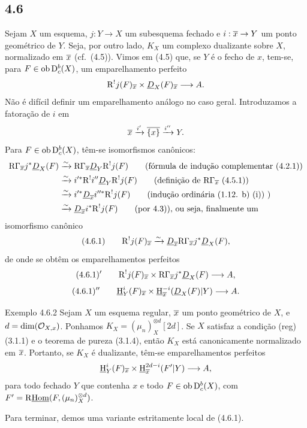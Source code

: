 \subsection*{4.6}
Sejam $X$ um esquema, $j:Y\to X$ um subesquema fechado e $i:\overline{x}\to Y$ um ponto geométrico de $Y$. Seja, por outro lado, $K_X$ um complexo dualizante sobre $X$, normalizado em $\overline{x}$ (cf.~(4.5)). Vimos em (4.5) que, se $Y$ é o fecho de $x$, tem-se, para $F\in\operatorname{ob}\mathrm{D}_c^b(X)$, um emparelhamento perfeito
\[
\mathrm{R}^{!}j(F)_{\overline{x}}\times \underline{D}_X(F)_{\overline{x}}\longrightarrow A.
\]
Não é difícil definir um emparelhamento análogo no caso geral. Introduzamos a fatoração de $i$ em
\[
\overline{x}\xrightarrow{i'}\overline{\{x\}}\xrightarrow{i''}Y.
\]
Para $F\in\operatorname{ob}\mathrm{D}_c^b(X)$, têm-se isomorfismos canônicos:
\[
\begin{aligned}
\mathrm{R}\Gamma_{\overline{x}}j^*\underline{D}_X(F)&\xrightarrow{\sim}\mathrm{R}\Gamma_{\overline{x}}\underline{D}_Y\mathrm{R}^{!}j(F)\qquad\text{(fórmula de indução complementar (4.2.1))}\\
&\xrightarrow{\sim}i'^*\mathrm{R}^{!}i''\underline{D}_Y\mathrm{R}^{!}j(F)\qquad\text{(definição de $\mathrm{R}\Gamma_{\overline{x}}$ (4.5.1))}\\
&\xrightarrow{\sim}i'^*\underline{D}_{\overline{x}}i''^*\mathrm{R}^{!}j(F)\qquad\text{(indução ordinária (1.12. b) (i)) )}\\
&\xrightarrow{\sim}\underline{D}_{\overline{x}}i^*\mathrm{R}^{!}j(F)\qquad\text{(por 4.3)), ou seja, finalmente um}
\end{aligned}
\]
isomorfismo canônico
\[
(4.6.1)\qquad \mathrm{R}^{!}j(F)_{\overline{x}}\xrightarrow{\sim}\underline{D}_{\overline{x}}\mathrm{R}\Gamma_{\overline{x}}j^*\underline{D}_X(F),
\]
de onde se obtêm os emparelhamentos perfeitos
\[
(4.6.1)'\qquad \mathrm{R}^{!}j(F)_{\overline{x}}\times \mathrm{R}\Gamma_{\overline{x}}j^*\underline{D}_X(F)\longrightarrow A,
\]
\[
(4.6.1)''\qquad \underline{\mathrm H}_Y^i(F)_{\overline{x}}\times \underline{\mathrm H}_{\overline{x}}^{-i}(\underline{D}_X(F)|Y)\longrightarrow A.
\]

\begin{statement}{Exemplo 4.6.2}
Sejam $X$ um esquema regular, $\overline{x}$ um ponto geométrico de $X$, e $d=\dim(\mathcal{O}_{X,x})$. Ponhamos $K_X=(\mu_n)_X^{\otimes d}[2d]$. Se $X$ satisfaz a condição (reg) (3.1.1) e o teorema de pureza (3.1.4), então $K_X$ está canonicamente normalizado em $\overline{x}$. Portanto, se $K_X$ é dualizante, têm-se emparelhamentos perfeitos
\[
\underline{\mathrm H}_Y^i(F)_{\overline{x}}\times \underline{\mathrm H}_{\overline{x}}^{2d-i}(F'|Y)\longrightarrow A,
\]
para todo fechado $Y$ que contenha $x$ e todo $F\in\operatorname{ob}\mathrm{D}_c^b(X)$, com $F'=\mathrm{R}\underline{\operatorname{Hom}}(F,(\mu_n)_X^{\otimes d})$.
\end{statement}

Para terminar, demos uma variante estritamente local de (4.6.1).
